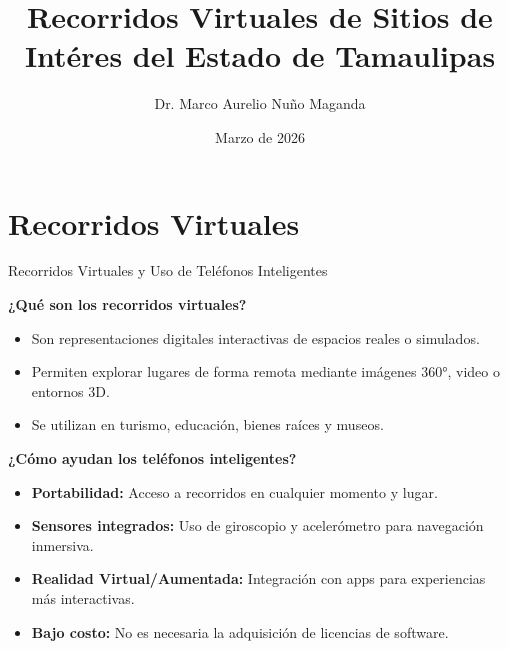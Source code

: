 \documentclass[aspectratio=169,compress]{beamer}
\title{Recorridos Virtuales de Sitios de Intéres del Estado de Tamaulipas} %
\author{Dr. Marco Aurelio Nu\~no Maganda}
\institute{Universidad Politécnica de Victoria\\ Laboratorio de Sistemas Inteligentes \\
mnunom@upv.edu.mx  \vspace{.25cm} }
\date{Marzo de 2026}
\begin{document}
\frame{
	\begin{titlepage}
	\end{titlepage}
	
}







%

\section[PRV]{Recorridos Virtuales}

\begin{frame}{Recorridos Virtuales y Uso de Teléfonos Inteligentes}

\textbf{¿Qué son los recorridos virtuales?}
\begin{itemize}
    \item Son representaciones digitales interactivas de espacios reales o simulados.
    \item Permiten explorar lugares de forma remota mediante imágenes 360°, video o entornos 3D.
    \item Se utilizan en turismo, educación, bienes raíces y museos.
\end{itemize}

\vspace{0.5cm}

\textbf{¿Cómo ayudan los teléfonos inteligentes?}
\begin{itemize}
    \item \textbf{Portabilidad:} Acceso a recorridos en cualquier momento y lugar.
    \item \textbf{Sensores integrados:} Uso de giroscopio y acelerómetro para navegación inmersiva.
    \item \textbf{Realidad Virtual/Aumentada:} Integración con apps para experiencias más interactivas.
    \item \textbf{Bajo costo:} No es necesaria la adquisición de licencias de software.
\end{itemize}

\end{frame}
\end{document}
